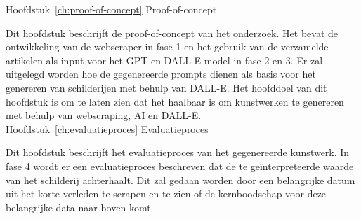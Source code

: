Hoofdstuk~\ref{ch:proof-of-concept} Proof-of-concept

Dit hoofdstuk beschrijft de proof-of-concept van het onderzoek. Het bevat de ontwikkeling van de webscraper in fase 1 en het gebruik van de verzamelde artikelen als input voor het GPT en DALL-E model in fase 2 en 3. Er zal uitgelegd worden hoe de gegenereerde prompts dienen als basis voor het genereren van schilderijen met behulp van DALL-E. Het hoofddoel van dit hoofdstuk is om te laten zien dat het haalbaar is om kunstwerken te genereren met behulp van webscraping, AI en DALL-E. \\

Hoofdstuk~\ref{ch:evaluatieproces} Evaluatieproces

Dit hoofdstuk beschrijft het evaluatieproces van het gegenereerde kunstwerk. In fase 4 wordt er een evaluatieproces beschreven dat de te geïnterpreteerde waarde van het schilderij achterhaalt. Dit zal gedaan worden door een belangrijke datum uit het korte verleden te scrapen en te zien of de kernboodschap voor deze belangrijke data naar boven komt. 



